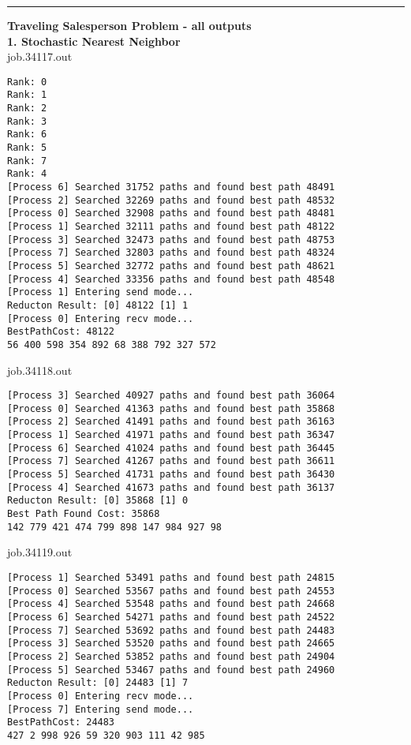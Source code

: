 \documentclass[letter, 12pt]{article}
\newenvironment{question}[1]{%
    \vspace{.2in}%
        \noindent{\bf #1}%
    \vspace{0.3em} \hrule \vspace{.1in}%
}{}
\begin{document}
\begin{question}{\large Appendix}
\vspace{\baselineskip}

\textbf{\large Traveling Salesperson Problem - all outputs}\\

\textbf{1. Stochastic Nearest Neighbor}\\

job.34117.out
\begin{lstlisting}[style=CStyle]
Rank: 0
Rank: 1
Rank: 2
Rank: 3
Rank: 6
Rank: 5
Rank: 7
Rank: 4
[Process 6] Searched 31752 paths and found best path 48491
[Process 2] Searched 32269 paths and found best path 48532
[Process 0] Searched 32908 paths and found best path 48481
[Process 1] Searched 32111 paths and found best path 48122
[Process 3] Searched 32473 paths and found best path 48753
[Process 7] Searched 32803 paths and found best path 48324
[Process 5] Searched 32772 paths and found best path 48621
[Process 4] Searched 33356 paths and found best path 48548
[Process 1] Entering send mode...
Reducton Result: [0] 48122 [1] 1
[Process 0] Entering recv mode...
BestPathCost: 48122
56 400 598 354 892 68 388 792 327 572 
\end{lstlisting}

job.34118.out
\begin{lstlisting}[style=CStyle]
[Process 3] Searched 40927 paths and found best path 36064
[Process 0] Searched 41363 paths and found best path 35868
[Process 2] Searched 41491 paths and found best path 36163
[Process 1] Searched 41971 paths and found best path 36347
[Process 6] Searched 41024 paths and found best path 36445
[Process 7] Searched 41267 paths and found best path 36611
[Process 5] Searched 41731 paths and found best path 36430
[Process 4] Searched 41673 paths and found best path 36137
Reducton Result: [0] 35868 [1] 0
Best Path Found Cost: 35868
142 779 421 474 799 898 147 984 927 98 
\end{lstlisting}

job.34119.out
\begin{lstlisting}[style=CStyle]
[Process 1] Searched 53491 paths and found best path 24815
[Process 0] Searched 53567 paths and found best path 24553
[Process 4] Searched 53548 paths and found best path 24668
[Process 6] Searched 54271 paths and found best path 24522
[Process 7] Searched 53692 paths and found best path 24483
[Process 3] Searched 53520 paths and found best path 24665
[Process 2] Searched 53852 paths and found best path 24904
[Process 5] Searched 53467 paths and found best path 24960
Reducton Result: [0] 24483 [1] 7
[Process 0] Entering recv mode...
[Process 7] Entering send mode...
BestPathCost: 24483
427 2 998 926 59 320 903 111 42 985 
\end{lstlisting}


\end{question}
\end{document}
